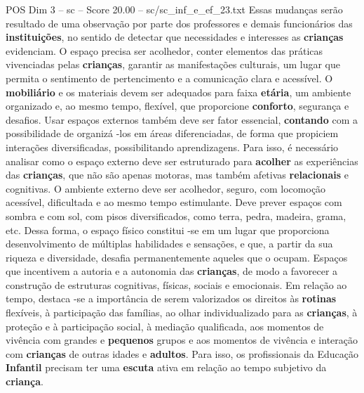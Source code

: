 \begin{textsample}{POS Dim 3 – sc – Score 20.00 – sc/sc\_inf\_e\_ef\_23.txt}
Essas mudanças serão resultado de uma observação por parte dos professores e demais funcionários das \textbf{instituições}, no sentido de detectar que necessidades e interesses as \textbf{crianças} evidenciam.
O espaço precisa ser acolhedor, conter elementos das práticas vivenciadas pelas \textbf{crianças}, garantir as manifestações culturais, um lugar que permita o sentimento de pertencimento e a comunicação clara e acessível.
O \textbf{mobiliário} e os materiais devem ser adequados para faixa \textbf{etária}, um ambiente organizado e, ao mesmo tempo, flexível, que proporcione \textbf{conforto}, segurança e desafios.
Usar espaços externos também deve ser fator essencial, \textbf{contando} com a possibilidade de organizá -los em áreas diferenciadas, de forma que propiciem interações diversificadas, possibilitando aprendizagens.
Para isso, é necessário analisar como o espaço externo deve ser estruturado para \textbf{acolher} as experiências das \textbf{crianças}, que não são apenas motoras, mas também afetivas \textbf{relacionais} e cognitivas.
O ambiente externo deve ser acolhedor, seguro, com locomoção acessível, dificultada e ao mesmo tempo estimulante.
Deve prever espaços com sombra e com sol, com pisos diversificados, como terra, pedra, madeira, grama, etc.
Dessa forma, o espaço físico constitui -se em um lugar que proporciona desenvolvimento de múltiplas habilidades e sensações, e que, a partir da sua riqueza e diversidade, desafia permanentemente aqueles que o ocupam.
Espaços que incentivem a autoria e a autonomia das \textbf{crianças}, de modo a favorecer a construção de estruturas cognitivas, físicas, sociais e emocionais.
Em relação ao tempo, destaca -se a importância de serem valorizados os direitos às \textbf{rotinas} flexíveis, à participação das famílias, ao olhar individualizado para as \textbf{crianças}, à proteção e à participação social, à mediação qualificada, aos momentos de vivência com grandes e \textbf{pequenos} grupos e aos momentos de vivência e interação com \textbf{crianças} de outras idades e \textbf{adultos}.
Para isso, os profissionais da Educação \textbf{Infantil} precisam ter uma \textbf{escuta} ativa em relação ao tempo subjetivo da \textbf{criança}.

\end{textsample}
